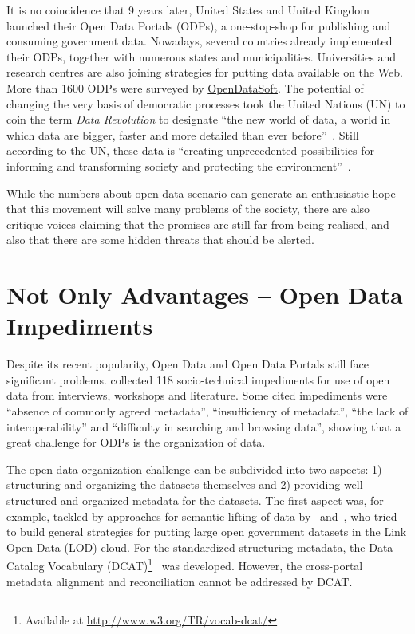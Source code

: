 It is no coincidence that 9 years later, United States and United Kingdom launched their Open Data Portals (ODPs), a one-stop-shop for publishing and consuming government data.
Nowadays, several countries already implemented their ODPs, together with numerous states and municipalities.
Universities and research centres are also joining strategies for putting data available on the Web.
More than 1600 ODPs were surveyed by \href{https://www.opendatasoft.com}{OpenDataSoft}.
The potential of changing the very basis of democratic processes took the United Nations (UN) to coin the term \emph{Data Revolution} to designate ``the new world of data, a world in which data are bigger, faster and more detailed than ever before''~\cite[p.4]{DataRevolutionGroup2014}.
Still according to the UN, these data is ``creating unprecedented possibilities for informing and transforming society and protecting the environment''~\cite[p.4]{DataRevolutionGroup2014}.

While the numbers about open data scenario can generate an enthusiastic hope that this movement will solve many problems of the society, there are also critique voices claiming that the promises are still far from being realised, and also that there are some hidden threats that should be alerted.

\section{Not Only Advantages -- Open Data Impediments}

Despite its recent popularity, Open Data and Open Data Portals still face significant problems.
 collected 118 socio-technical impediments for use of open data from interviews, workshops and literature.
Some cited impediments were ``absence of commonly agreed metadata'', ``insufficiency of metadata'', ``the lack of interoperability'' and ``difficulty in searching and browsing data'', showing that a great challenge for ODPs is the organization of data.

The open data organization challenge can be subdivided into two aspects: 1) structuring and organizing the datasets themselves and 2) providing well-structured and organized metadata for the datasets.
The first aspect was, for example, tackled by approaches for semantic lifting of data by~ and~, who tried to build general strategies for putting large open government datasets in the Link Open Data (LOD) cloud.
For the standardized structuring metadata, the Data Catalog Vocabulary (DCAT)\footnote{Available at \url{http://www.w3.org/TR/vocab-dcat/}}~\cite{conf/i-semantics/CyganiakMP10} was developed.
However, the cross-portal metadata alignment and reconciliation cannot be addressed by DCAT.

